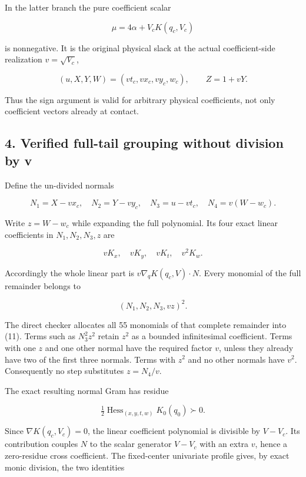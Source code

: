 In the latter branch the pure coefficient scalar

\[
\mu=4\alpha+V_cK(q_c,V_c)
\tag{9}
\]

is nonnegative. It is the original physical slack at the actual
coefficient-side realization \(v=\sqrt{V_c}\),

\[
(u,X,Y,W)=(v t_c,v x_c,v y_c,w_c),\qquad Z=1+vY.
\]

Thus the sign argument is valid for arbitrary physical coefficients, not
only coefficient vectors already at contact.

\hypertarget{verified-full-tail-grouping-without-division-by-v}{%
\subsection{4. Verified full-tail grouping without division by v}\label{p03b551f2a9a0:verified-full-tail-grouping-without-division-by-v}}

Define the un-divided normals

\[
N_1=X-vx_c,\quad N_2=Y-vy_c,\quad N_3=u-vt_c,
\quad N_4=v(W-w_c).
\tag{10}
\]

Write \(z=W-w_c\) while expanding the full polynomial. Its four exact
linear coefficients in \(N_1,N_2,N_3,z\) are

\[
vK_x,\quad vK_y,\quad vK_t,\quad v^2K_w.
\]

Accordingly the whole linear part is \(v\nabla_qK(q_c,V)\cdot N\).
Every monomial of the full remainder belongs to

\[
(N_1,N_2,N_3,vz)^2.
\tag{11}
\]

The direct checker allocates all 55 monomials of that complete remainder
into (11). Terms such as \(N_3^2z^2\) retain \(z^2\) as a bounded
infinitesimal coefficient. Terms with one \(z\) and one other normal have
the required factor \(v\), unless they already have two of the first
three normals. Terms with \(z^2\) and no other normals have \(v^2\).
Consequently no step substitutes \(z=N_4/v\).

The exact resulting normal Gram has residue

\[
\tfrac12\operatorname{Hess}_{(x,y,t,w)}K_0(q_0)\succ0.
\tag{12}
\]

Since \(\nabla K(q_c,V_c)=0\), the linear coefficient polynomial is
divisible by \(V-V_c\). Its contribution couples \(N\) to the scalar
generator \(V-V_c\) with an extra \(v\), hence a zero-residue cross
coefficient. The fixed-center univariate profile gives, by exact monic
division, the two identities

